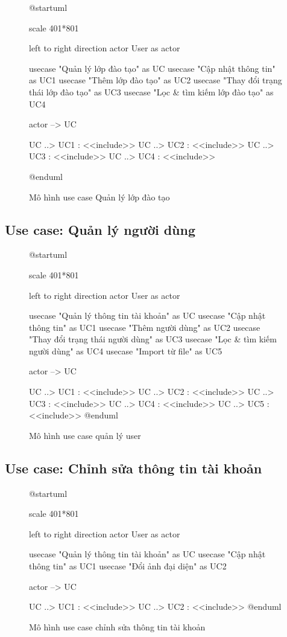 \documentclass[report.tex]{subfiles}
\begin{document}
\begin{figure}[!ht]
\caption{Mô hình use case Quản lý lớp đào tạo}
\begin{plantuml}

@startuml

scale 401*801

left to right direction
actor User as actor

usecase "Quản lý lớp đào tạo" as UC
usecase "Cập nhật thông tin" as UC1
usecase "Thêm lớp đào tạo" as UC2
usecase "Thay đổi trạng thái lớp đào tạo" as UC3
usecase "Lọc & tìm kiếm lớp đào tạo" as UC4

actor --> UC

UC ..> UC1 : <<include>>
UC ..> UC2 : <<include>>
UC ..> UC3 : <<include>>
UC ..> UC4 : <<include>>

@enduml
\end{plantuml}
\end{figure}
\FloatBarrier

\subsection{Use case: Quản lý người dùng}

\begin{figure}[!ht]
\caption{Mô hình use case quản lý user}
\begin{plantuml}

@startuml

scale 401*801

left to right direction
actor User as actor

usecase "Quản lý thông tin tài khoản" as UC
usecase "Cập nhật thông tin" as UC1
usecase "Thêm người dùng" as UC2
usecase "Thay đổi trạng thái người dùng" as UC3
usecase "Lọc & tìm kiếm người dùng" as UC4
usecase "Import từ file" as UC5

actor --> UC

UC ..> UC1 : <<include>>
UC ..> UC2 : <<include>>
UC ..> UC3 : <<include>>
UC ..> UC4 : <<include>>
UC ..> UC5 : <<include>>
@enduml
\end{plantuml}
\end{figure}
\FloatBarrier

\subsection{Use case: Chỉnh sửa thông tin tài khoản}

\begin{figure}[!ht]
\caption{Mô hình use case chỉnh sửa thông tin tài khoản}
\begin{plantuml}

@startuml

scale 401*801

left to right direction
actor User as actor

usecase "Quản lý thông tin tài khoản" as UC
usecase "Cập nhật thông tin" as UC1
usecase "Đổi ảnh đại diện" as UC2

actor --> UC

UC ..> UC1 : <<include>>
UC ..> UC2 : <<include>>
@enduml
\end{plantuml}
\end{figure}
\FloatBarrier
\end{document}
